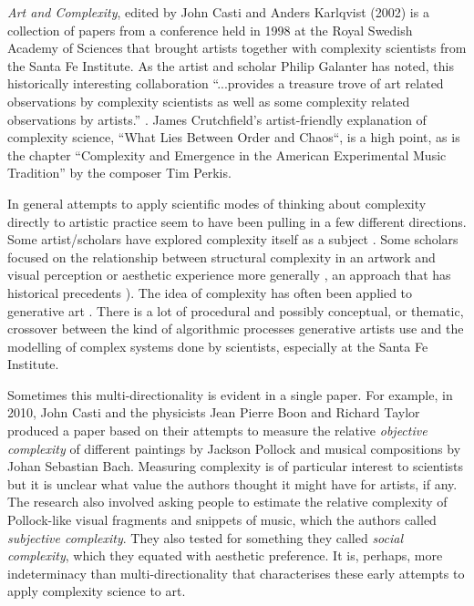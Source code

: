         \emph{Art and Complexity}, edited by John Casti and Anders Karlqvist (2002) is a collection of papers from a conference held in 1998 at the Royal Swedish Academy of Sciences that brought artists together with complexity scientists from the Santa Fe Institute. As the artist and scholar Philip Galanter has noted, this historically interesting collaboration “...provides a treasure trove of art related observations by complexity scientists as well as some complexity related observations by artists.” \citep{GalanterAgnstRdctnsm2010}. James Crutchfield's artist-friendly explanation of complexity science, “What Lies Between Order and Chaos“, is a high point, as is the chapter “Complexity and Emergence in the American Experimental Music Tradition” by the composer Tim Perkis.

        In general attempts to apply scientific modes of thinking about complexity directly to artistic practice seem to have been pulling in a few different directions. Some artist/scholars have explored complexity itself as a subject \citep{GalanterAgnstRdctnsm2010} \citep{GalanterLevyComplexity2003} \citep{KappraffCmplxtyChs2019} \citep{PerkisCmplxtyEmrgnc2003} \citep{SommererMdllngCmplxty2002} \citep{MignonneauMdllngEmrgncCmplxty2002} \citep{SommererMignonneauMdllngCmplxty2003}. Some scholars focused on the relationship between structural complexity in an artwork and visual perception \citep{Yevin_ComplexityTheoryOfArt_2006} \citep{KochArtsAndHlth2017} or aesthetic experience more generally \citep{BirkinArtCmplxty2007} \citep{RigauEtAlInfrmtnAsthtcMsrs2008} \citep{BirkinAsthtcCmplxty2010}, an approach that has historical precedents \citep{AnrheimAComplexityScaleOfMovement1954}). The idea of complexity has often been applied to generative art \citep{SommererMdllngCmplxty2002} \citep{MignonneauMdllngEmrgncCmplxty2002} \citep{GalanterWhtIsGnrtvArt2003} \citep{SommererMignonneauMdllngCmplxty2003} \citep{GalanterGnrtvArtThry2016} \citep{GalanterTwrdsEthclRltnshpsWthMchns2020}. There is a lot of procedural and possibly conceptual, or thematic, crossover between the kind of algorithmic processes generative artists use and the modelling of complex systems done by scientists, especially at the Santa Fe Institute.
        
        Sometimes this multi-directionality is evident in a single paper. For example, in 2010, John Casti and the physicists Jean Pierre Boon and Richard Taylor produced a paper based on their attempts to measure the relative \emph{objective complexity} of different paintings by Jackson Pollock and musical compositions by Johan Sebastian Bach. Measuring complexity is of particular interest to scientists but it is unclear what value the authors thought it might have for artists, if any. The research also involved asking people to estimate the relative complexity of Pollock-like visual fragments and snippets of music, which the authors called \emph{subjective complexity}. They also tested for something they called \emph{social complexity}, which they equated with aesthetic preference. It is, perhaps, more indeterminacy than multi-directionality that characterises these early attempts to apply complexity science to art.

